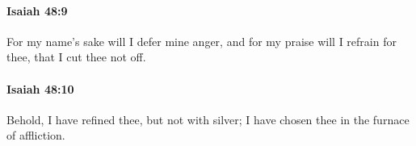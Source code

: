 		\paragraph{Isaiah 48:9} %
			\label{ISAIAH-48-9}

			For my name's sake will I defer mine anger, and for my praise will I refrain for thee, that I cut thee not off.


		\paragraph{Isaiah 48:10} %
			\label{ISAIAH-48-10}

			Behold, I have refined thee, but not with silver; I have chosen thee in the furnace of affliction.


